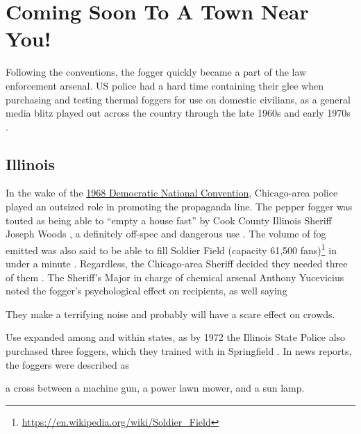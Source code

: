 \documentclass[
  11pt,
  titlepage]{krantz}
\renewenvironment{quote}{\begin{VF}}{\end{VF}}
\renewcommand{\href}[2]{#2\footnote{\url{#1}}}
\begin{document}
\hypertarget{coming-soon-to-a-town-near-you}{%
\section*{Coming Soon To A Town Near You!}\label{coming-soon-to-a-town-near-you}}


Following the conventions, the fogger quickly became a part of the law enforcement arsenal.
US police had a hard time containing their glee when purchasing and testing thermal foggers for use on domestic civilians, as a general media blitz played out across the country through the late 1960s and early 1970s \citep{PlainDealer1971}.

\hypertarget{illinois}{%
\subsection*{Illinois}\label{illinois}}


In the wake of the \protect\hyperlink{ChicagoIL1968_08_26}{1968 Democratic National Convention}, Chicago-area police played an outsized role in promoting the propaganda line.
The pepper fogger was touted as being able to ``empty a house fast'' by Cook County Illinois Sheriff Joseph Woods \citep{MtVernonRegisterNews1969_04_09, DailyDispatch1969_04_09}, a definitely off-spec and dangerous use \citep{Nixalite2009b}.
The volume of fog emitted was also said to be able to fill \href{https://en.wikipedia.org/wiki/Soldier_Field}{Soldier Field (capacity 61,500 fans)} in under a minute \citep{DailyDispatch1969_04_09}.
Regardless, the Chicago-area Sheriff decided they needed three of them \citep{DailyDispatch1969_04_09}.
The Sheriff's Major in charge of chemical arsenal Anthony Yucevicius noted the fogger's psychological effect on recipients, as well saying

\begin{quote}
They make a terrifying noise and probably will have a scare effect on crowds.

\end{quote}

Use expanded among and within states, as by 1972 the Illinois State Police also purchased three foggers, which they trained with in Springfield \citep{Robinson1972}.
In news reports, the foggers were described as

\begin{quote}
a cross between a machine gun, a power lawn mower, and a sun lamp.

\end{quote}
\end{document}
